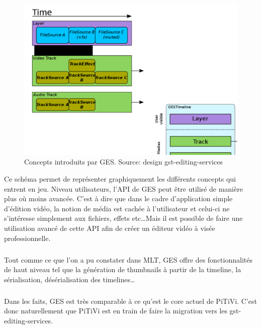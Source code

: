 \begin{figure} [H]

  \begin{center}

    \includegraphics[width=1.0\textwidth]{images/ges}

  \end{center}

  \caption{Concepts introduits par GES. Source: design
  gst-editing-services}

  \label{Yes}

\end{figure}

Ce schéma permet de représenter graphiquement les différents concepts
qui entrent en jeu. Niveau utilisateurs, l'API de GES peut
être utilisé de manière plus où moins avancée. C'est à dire
que dans le cadre d'application simple d'édition vidéo, la notion
de média est cachée à l'utilisateur et celui-ci ne s'intéresse
simplement aux fichiers, effets etc\ldots Mais il est possible de faire
une utilisation avancé de cette API afin de créer un éditeur vidéo
à visée professionnelle.

\subparagraph{}

Tout comme ce que l'on a pu constater dans MLT, GES offre des
fonctionnalités de haut niveau tel que la génération de thumbnails
à partir de la timeline, la sérialisation, désérialisation des
timelines\ldots

\subparagraph{}

Dans les faits, GES est très comparable à ce qu'est le core actuel
de PiTiVi. C'est donc naturellement que PiTiVi est en train de faire la
migration vers les gst-editing-services.


